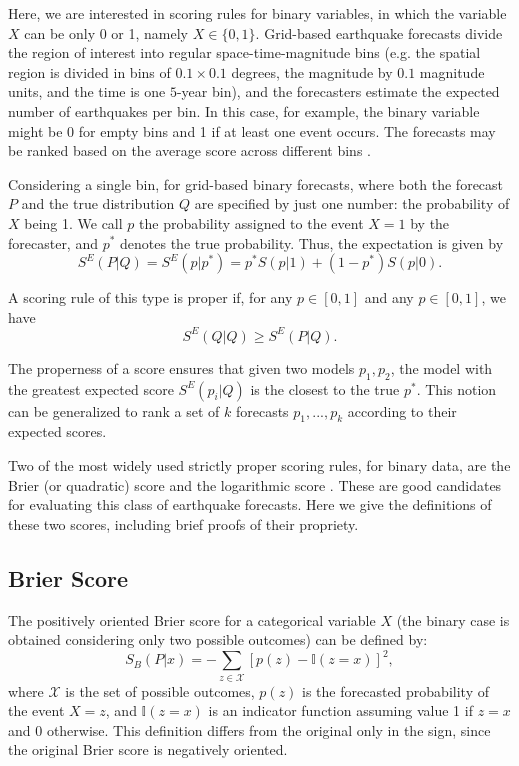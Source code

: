 \documentclass[referee,sn-basic]{sn-jnl}
\theoremstyle{thmstyleone}%
\theoremstyle{thmstyletwo}%
\theoremstyle{thmstylethree}%
\begin{document}
Here, we are interested in scoring rules for binary variables, in which the variable $X$ can be only 0 or 1, namely $X \in \{0,1\}$. Grid-based earthquake forecasts divide the region of interest into regular space-time-magnitude bins (e.g. the spatial region is divided in bins of $0.1 \times 0.1$ degrees, the magnitude by $0.1$ magnitude units, and the time is one $5$-year bin), and the forecasters estimate the expected number of earthquakes per bin. In this case, for example, the binary variable might be 0 for empty bins and 1 if at least one event occurs. The forecasts may be ranked based on the average score across different bins \citep{zechar2013regional}. 

Considering a single bin, for grid-based binary forecasts, where both the forecast $P$ and the true distribution $Q$ are specified by just one number: the probability of $X$ being 1. We call $p$ the probability assigned to the event $X = 1$ by the forecaster, and $p^*$ denotes the true probability. Thus, the expectation is given by
\begin{equation}
S^E(P\vert  Q) = S^E(p \vert  p^*) = p^*S(p\vert 1) + (1-p^*)S(p\vert 0) .
\label{eq:exp_score_deco}
\end{equation}

A scoring rule of this type is proper if, for any $p \in [0,1]$ and any $p \in [0,1]$, we have 
$$
S^E(Q\vert Q) \geq S^E(P\vert Q) .
$$

\noindent The properness of a score ensures that given two models $p_1, p_2$, the model with the greatest expected score $S^E(p_i\vert Q)$ is the closest to the true $p^*$. This notion can be generalized to rank a set of $k$ forecasts $p_1,...,p_k$ according to their expected scores.

Two of the most widely used strictly proper scoring rules, for binary data, are the Brier (or quadratic) score \citep{brier1950verification} and the logarithmic score \citep{goodj}. These are good candidates for evaluating this class of earthquake forecasts. Here we give the definitions of these two scores, including brief proofs of their propriety.

\subsection{ Brier Score }

The positively oriented Brier score \citep{brier1950verification} for a categorical variable $X$ (the binary case is obtained considering only two possible outcomes) can be defined by: 
\begin{equation}
S_B(P\vert x) = - \sum_{z\in \mathcal X} [p(z) - \mathbb{I}(z = x)]^2,
\label{eq:brier_def}
\end{equation}
where $\mathcal X$ is the set of possible outcomes, $p(z)$ is the forecasted probability of the event $X = z$, and $\mathbb I(z=x)$ is an indicator function assuming value 1 if $z=x$ and 0 otherwise. This definition differs from the original only in the sign, since the original Brier score is negatively oriented.  
\end{document}
